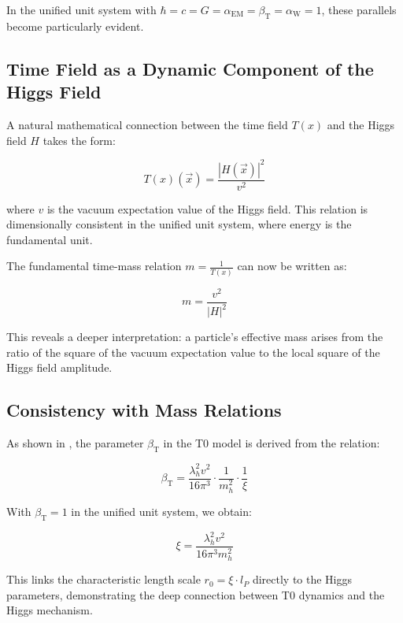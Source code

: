 \documentclass[12pt,a4paper]{article}
\newcommand{\Tfield}{T(x)}
\newcommand{\betaT}{\beta_{\text{T}}}
\newcommand{\alphaEM}{\alpha_{\text{EM}}}
\newcommand{\alphaW}{\alpha_{\text{W}}}
\newcommand{\vecx}{\vec{x}}
\begin{document}
	In the unified unit system with \(\hbar = c = G = \alphaEM = \betaT = \alphaW = 1\), these parallels become particularly evident.
	
	\subsection{Time Field as a Dynamic Component of the Higgs Field}
	A natural mathematical connection between the time field \(\Tfield\) and the Higgs field \(H\) takes the form:
	
	\begin{equation}
		\Tfield(\vecx) = \frac{|H(\vecx)|^2}{v^2}
	\end{equation}
	
	where \(v\) is the vacuum expectation value of the Higgs field. This relation is dimensionally consistent in the unified unit system, where energy is the fundamental unit.
	
	The fundamental time-mass relation \(m = \frac{1}{\Tfield}\) can now be written as:
	
	\begin{equation}
		m = \frac{v^2}{|H|^2}
	\end{equation}
	
	This reveals a deeper interpretation: a particle’s effective mass arises from the ratio of the square of the vacuum expectation value to the local square of the Higgs field amplitude.
	
	\subsection{Consistency with Mass Relations}
	As shown in \cite{pascher_params_2025}, the parameter \(\betaT\) in the T0 model is derived from the relation:
	
	\begin{equation}
		\betaT = \frac{\lambda_h^2 v^2}{16\pi^3} \cdot \frac{1}{m_h^2} \cdot \frac{1}{\xi}
	\end{equation}
	
	With \(\betaT = 1\) in the unified unit system, we obtain:
	
	\begin{equation}
		\xi = \frac{\lambda_h^2 v^2}{16\pi^3 m_h^2}
	\end{equation}
	
	This links the characteristic length scale \(r_0 = \xi \cdot l_P\) directly to the Higgs parameters, demonstrating the deep connection between T0 dynamics and the Higgs mechanism.
	
\end{document}
